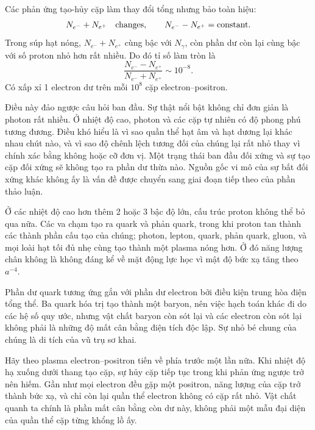 Các phản ứng tạo-hủy cặp làm thay đổi tổng nhưng bảo toàn hiệu:
\begin{equation}
N_{e^-}+N_{e^+}\quad\hbox{changes},
\qquad
N_{e^-}-N_{e^+}=\hbox{constant}.
\label{eq:c07-pair-invariants}
\end{equation}
Trong súp hạt nóng, \(N_{e^-}+N_{e^+}\) cùng bậc với \(N_\gamma\), còn phần dư còn lại cùng bậc với số proton nhỏ hơn rất nhiều. Do đó tỉ số làm tròn là
\begin{equation}
\boxed{
\frac{N_{e^-}-N_{e^+}}
{N_{e^-}+N_{e^+}}
\sim10^{-8}
}.
\label{eq:c07-asymmetry}
\end{equation}
Có xấp xỉ 1 electron dư trên mỗi \(10^8\) cặp electron--positron.

Điều này đảo ngược câu hỏi ban đầu. Sự thật nổi bật không chỉ đơn giản là photon rất nhiều. Ở nhiệt độ cao, photon và các cặp tự nhiên có độ phong phú tương đương. Điều khó hiểu là vì sao quần thể hạt âm và hạt dương lại khác nhau chút nào, và vì sao độ chênh lệch tương đối của chúng lại rất nhỏ thay vì chính xác bằng không hoặc cỡ đơn vị. Một trạng thái ban đầu đối xứng và sự tạo cặp đối xứng sẽ không tạo ra phần dư thừa nào. Nguồn gốc vi mô của sự bất đối xứng khác không ấy là vấn đề được chuyển sang giai đoạn tiếp theo của phần thảo luận.

Ở các nhiệt độ cao hơn thêm 2 hoặc 3 bậc độ lớn, cấu trúc proton không thể bỏ qua nữa. Các va chạm tạo ra quark và phản quark, trong khi proton tan thành các thành phần cấu tạo của chúng; photon, lepton, quark, phản quark, gluon, và mọi loài hạt tối đủ nhẹ cùng tạo thành một plasma nóng hơn. Ở đó năng lượng chân không là không đáng kể về mặt động lực học vì mật độ bức xạ tăng theo \(a^{-4}\).

Phần dư quark tương ứng gắn với phần dư electron bởi điều kiện trung hòa điện tổng thể. Ba quark hóa trị tạo thành một baryon, nên việc hạch toán khác đi do các hệ số quy ước, nhưng vật chất baryon còn sót lại và các electron còn sót lại không phải là những độ mất cân bằng điện tích độc lập. Sự nhỏ bé chung của chúng là di tích của vũ trụ sơ khai.

Hãy theo plasma electron--positron tiến về phía trước một lần nữa. Khi nhiệt độ hạ xuống dưới thang tạo cặp, sự hủy cặp tiếp tục trong khi phản ứng ngược trở nên hiếm. Gần như mọi electron đều gặp một positron, năng lượng của cặp trở thành bức xạ, và chỉ còn lại quần thể electron không có cặp rất nhỏ. Vật chất quanh ta chính là phần mất cân bằng còn dư này, không phải một mẫu đại diện của quần thể cặp từng khổng lồ ấy.

